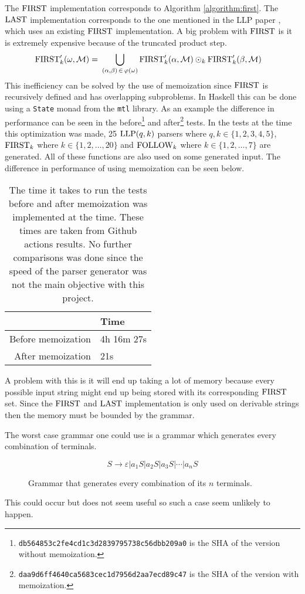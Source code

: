 The $\text{FIRST}$ implementation corresponds to Algorithm \ref{algorithm:first}. The $\text{LAST}$ implementation corresponds to the one mentioned in the LLP paper \cite[12]{Vagner2007}, which uses an existing $\text{FIRST}$ implementation. A big problem with $\text{FIRST}$ is it is extremely expensive because of the truncated product step.
\begin{align*}
    \text{FIRST}'_k(\omega, \mathcal{M}) =&\,\, \bigcup_{(\alpha, \beta) \, \in \, \varphi(\omega)} \text{FIRST}'_k(\alpha, \mathcal{M}) \odot_k \text{FIRST}'_k(\beta, \mathcal{M})
\end{align*}
This inefficiency can be solved by the use of memoization since $\text{FIRST}$ is recursively defined and has overlapping subproblems. In Haskell this can be done using a \lstinline|State| monad from the \lstinline|mtl| library. As an example the difference in performance can be seen in the before\footnote{\texttt{db564853c2fe4cd1c3d2839795738c56dbb209a0} is the SHA of the version without memoization.} and after\footnote{\texttt{daa9d6ff4640ca5683cec1d7956d2aa7ecd89c47} is the SHA of the version with memoization.} tests. In the tests at the time this optimization was made, 25 $\text{LLP}(q,k)$ parsers where $q, k \in \{1, 2, 3, 4, 5\}$, $\text{FIRST}_k$ where $k \in \{1, 2, \dots, 20\}$ and $\text{FOLLOW}_k$ where $k \in \{1, 2, \dots, 7\}$ are generated. All of these functions are also used on some generated input. The difference in performance of using memoization can be seen below. 
\begin{table}[H]
    \centering
    \begin{tabular}{r|l}
         & Time \\ \hline
        Before memoization & 4h 16m 27s \\
        After memoization & 21s
    \end{tabular}
    \caption{The time it takes to run the tests before and after memoization was implemented at the time. These times are taken from Github actions results. No further comparisons was done since the speed of the parser generator was not the main objective with this project.}
\end{table}
\noindent A problem with this is it will end up taking a lot of memory because every possible input string might end up being stored with its corresponding $\text{FIRST}$ set. Since the $\text{FIRST}$ and $\text{LAST}$ implementation is only used on derivable strings then the memory must be bounded by the grammar.

The worst case grammar one could use is a grammar which generates every combination of terminals.
\begin{figure}
    \begin{equation*}
        \label{fig:combination-grammar}
        S \to \varepsilon | a_1 S | a_2 S | a_3 S | \cdots | a_n S
    \end{equation*}
    \caption{Grammar that generates every combination of its $n$ terminals.}    
\end{figure}
This could occur but does not seem useful so such a case seem unlikely to happen.